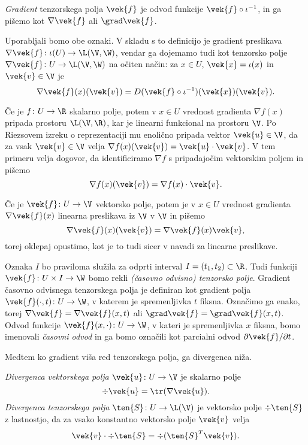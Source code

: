 \begin{definicija}
	\emph{Gradient} tenzorskega polja $\vek{f}$ je odvod funkcije $\vek{f}\circ\iota^{-1}$,
	in ga pišemo kot $\nabla\vek{f}$ ali $\grad\vek{f}$.
\end{definicija}
Uporabljali bomo obe oznaki. V skladu s to definicijo je gradient preslikava
$\nabla\vek{f}\colon\iota(U)\to\L(\V,\W)$, vendar ga dojemamo tudi kot tenzorsko polje
$\nabla\vek{f}\colon U\to\L(\V,\W)$ na očiten način: za $x\in U$,
$\vek{x}=\iota(x)$ in $\vek{v}\in\V$ je
\[
	\nabla\vek{f}(x)(\vek{v})=D(\vek{f}\circ\iota^{-1})(\vek{x})(\vek{v}).
\]

Če je $f\colon U\to\R$ skalarno polje, potem v $x\in U$ vrednost gradienta $\nabla f(x)$
pripada prostoru $\L(\V,\R)$, kar je linearni funkcional na prostoru $\V$. Po Riezsovem
izreku o reprezentaciji mu enolično pripada vektor $\vek{u}\in\V$, da za vsak
$\vek{v}\in\V$ velja $\nabla f(x)(\vek{v})=\vek{u}\cdot\vek{v}$. V tem primeru velja
dogovor, da identificiramo $\nabla f$ s pripadajočim vektorskim poljem in pišemo
\[ \nabla f(x)(\vek{v})=\nabla f(x)\cdot\vek{v}. \]

Če je $\vek{f}\colon U\to\V$ vektorsko polje, potem je v $x\in U$ vrednost gradienta $\nabla\vek{f}(x)$
linearna preslikava iz $\V$ v $\V$ in pišemo
\[ \nabla\vek{f}(x)(\vek{v})=\nabla\vek{f}(x)\vek{v}, \]
torej oklepaj opustimo, kot je to tudi sicer v navadi za linearne preslikave.

Oznaka $I$ bo praviloma služila za odprti interval $I=(t_1,t_2)\subset\R$. Tudi funkciji
$\vek{f}\colon U\times I\to\W$ bomo rekli \emph{(časovno odvisno) tenzorsko polje}.
Gradient časovno odvisnega tenzorskega polja je definiran kot gradient polja
$\vek{f}(\cdot,t)\colon U\to\W$, v katerem je spremenljivka $t$ fiksna. Označimo
ga enako, torej $\nabla\vek{f}=\nabla\vek{f}(x,t)$ ali $\grad\vek{f}=\grad\vek{f}(x,t)$.
Odvod funkcije $\vek{f}(x,\cdot)\colon U\to\W$, v kateri je spremenljivka $x$ fiksna,
bomo imenovali \emph{časovni odvod} in ga bomo označili kot parcialni odvod
$\partial\vek{f}/\partial t$.

Medtem ko gradient viša red tenzorskega polja, ga divergenca niža.
\begin{definicija} \label{def:div}
	\emph{Divergenca vektorskega polja} $\vek{u}\colon U\to\V$ je skalarno polje
	\begin{equation} \label{e:div1}
		\div\vek{u}=\tr(\nabla\vek{u}).
	\end{equation}
	\emph{Divergenca tenzorskega polja} $\ten{S}\colon U\to\L(\V)$ je vektorsko polje $\div\ten{S}$ z lastnostjo,
	da za vsako konstantno vektorsko polje $\vek{v}$ velja
	\begin{equation} \label{e:div2}
		\vek{v}\cdot\div\ten{S} = \div(\ten{S}^{T}\vek{v}).
	\end{equation}
\end{definicija}

